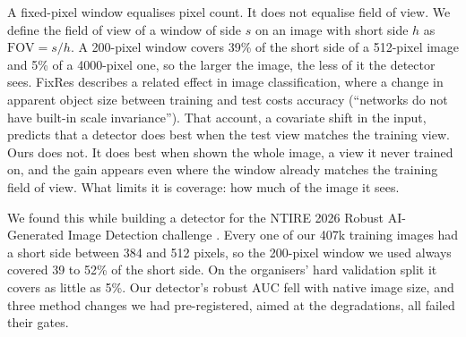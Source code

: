 \documentclass[letterpaper]{article} %
\newcommand{\fov}{\mathrm{FOV}}
\begin{document}
A fixed-pixel window equalises pixel count. It does not equalise field of
view. We define the field of view of a window of side $s$ on an image with
short side $h$ as $\fov = s/h$. A 200-pixel window covers 39\% of the short
side of a 512-pixel image and 5\% of a 4000-pixel one, so the larger the
image, the less of it the detector sees. FixRes \cite{touvron2019fixres}
describes a related effect in image classification, where a change in
apparent object size between training and test costs accuracy (``networks do
not have built-in scale invariance''). That account, a covariate
shift \cite{shimodaira2000covariate} in the input, predicts that a detector
does best when the test view matches the training view. Ours does not. It
does best when shown the whole image, a view it never trained on, and the
gain appears even where the window already matches the training field of
view. What limits it is coverage: how much of the image it sees.

We found this while building a detector for the NTIRE 2026 Robust
AI-Generated Image Detection challenge \cite{gushchin2026ntire}. Every one of
our 407k training images had a short side between 384 and 512 pixels, so the
200-pixel window we used always covered 39 to 52\% of the short side. On the
organisers' hard validation split it covers as little as 5\%. Our detector's robust AUC fell with
native image size, and three method changes we had pre-registered, aimed at
the degradations, all failed their gates.
\end{document}
